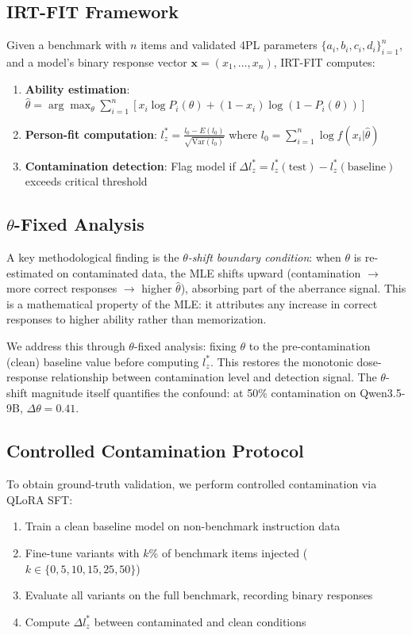 \documentclass[11pt,a4paper]{article}
\newcommand{\lzstar}{$l_{z}^{*}$}
\newcommand{\thetafix}{$\theta$-fixed}
\begin{document}
\subsection{IRT-FIT Framework}

Given a benchmark with $n$ items and validated 4PL parameters $\{a_i, b_i, c_i, d_i\}_{i=1}^n$, and a model's binary response vector $\mathbf{x} = (x_1, \ldots, x_n)$, IRT-FIT computes:

\begin{enumerate}
\item \textbf{Ability estimation}: $\hat{\theta} = \arg\max_\theta \sum_{i=1}^n \left[ x_i \log P_i(\theta) + (1-x_i) \log(1-P_i(\theta)) \right]$
\item \textbf{Person-fit computation}: $l_z^* = \frac{l_0 - E(l_0)}{\sqrt{\text{Var}(l_0)}}$ where $l_0 = \sum_{i=1}^n \log f(x_i | \hat\theta)$
\item \textbf{Contamination detection}: Flag model if $\Delta l_z^* = l_z^*(\text{test}) - l_z^*(\text{baseline})$ exceeds critical threshold
\end{enumerate}

\subsection{$\theta$-Fixed Analysis}

A key methodological finding is the \emph{$\theta$-shift boundary condition}: when $\theta$ is re-estimated on contaminated data, the MLE shifts upward (contamination $\to$ more correct responses $\to$ higher $\hat\theta$), absorbing part of the aberrance signal.
This is a mathematical property of the MLE: it attributes any increase in correct responses to higher ability rather than memorization.

We address this through \thetafix{} analysis: fixing $\theta$ to the pre-contamination (clean) baseline value before computing \lzstar{}.
This restores the monotonic dose-response relationship between contamination level and detection signal.
The $\theta$-shift magnitude itself quantifies the confound: at 50\% contamination on Qwen3.5-9B, $\Delta\theta = 0.41$.

\subsection{Controlled Contamination Protocol}

To obtain ground-truth validation, we perform controlled contamination via QLoRA SFT:
\begin{enumerate}
\item Train a clean baseline model on non-benchmark instruction data
\item Fine-tune variants with $k\%$ of benchmark items injected ($k \in \{0, 5, 10, 15, 25, 50\}$)
\item Evaluate all variants on the full benchmark, recording binary responses
\item Compute $\Delta l_z^*$ between contaminated and clean conditions
\end{enumerate}
\end{document}
